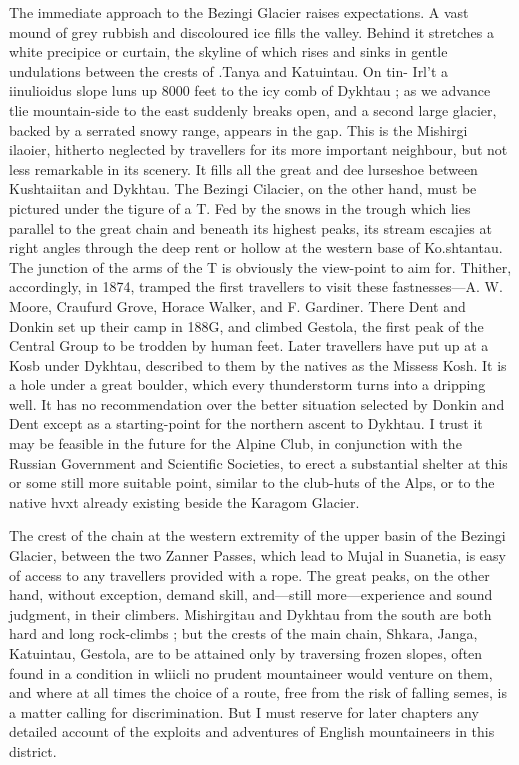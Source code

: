 \documentclass{article}
\begin{document}
	The immediate approach to the Bezingi Glacier raises expectations. A vast mound of grey rubbish and discoloured ice fills the valley. Behind it stretches a white precipice or curtain, the skyline of which rises and sinks in gentle undulations between the crests of .Tanya and Katuintau. On tin- Irl't a iinulioidus slope luns up 8000 feet to the icy comb of Dykhtau ; as we advance tlie mountain-side to the east suddenly breaks open, and a second large glacier, backed by a serrated snowy range, appears in the gap. This is the Mishirgi ilaoier, hitherto neglected by travellers for its more important neighbour, but not less remarkable in its scenery. It fills all the great and dee lurseshoe between Kushtaiitan and Dykhtau. The Bezingi Cilacier, on the other hand, must be pictured under the tigure of a T. Fed by the snows in the trough which lies parallel to the great chain and beneath its highest peaks, its stream escajies at right angles through the deep rent or hollow at the western base of Ko.shtantau. The junction of the arms of the T is obviously the view-point to aim for. Thither, accordingly, in 1874, tramped the first travellers to visit these fastnesses—A. W. Moore, Craufurd Grove, Horace Walker, and F. Gardiner. There Dent and Donkin set up their camp in 188G, and climbed Gestola, the first peak of the Central Group to be trodden by human feet. Later travellers have put up at a Kosb under Dykhtau, described to them by the natives as the Missess Kosh. It is a hole under a great boulder, which every thunderstorm turns into a dripping well. It has no recommendation over the better situation selected by Donkin and Dent except as a starting-point for the northern ascent to Dykhtau. I trust it may be feasible in the future for the Alpine Club, in conjunction with the Russian Government and Scientific Societies, to erect a substantial shelter at this or some still more suitable point, similar to the club-huts of the Alps, or to the native hvxt already existing beside the Karagom Glacier.

The crest of the chain at the western extremity of the upper basin of the Bezingi Glacier, between the two Zanner Passes, which lead to Mujal in Suanetia, is easy of access to any travellers provided with a rope. The great peaks, on the other hand, without exception, demand skill, and—still more—experience and sound judgment, in their climbers. Mishirgitau and Dykhtau from the south are both hard and long rock-climbs ; but the crests of the main chain, Shkara, Janga, Katuintau, Gestola, are to be attained only by traversing frozen slopes, often found in a condition in wliicli no prudent mountaineer would venture on them, and where at all times the choice of a route, free from the risk of falling semes, is a matter calling for discrimination. But I must reserve for later chapters any detailed account of the exploits and adventures of English mountaineers in this district.
\end{document}
